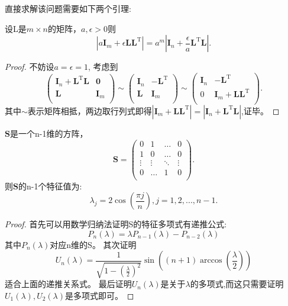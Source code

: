 直接求解该问题需要如下两个引理:
\begin{lemma}\label{lemma:change}
设L是$m\times n$的矩阵，$a,\epsilon > 0$则
\begin{equation}
|a\bm{I}_m+\epsilon \bm{L}\bm{L}^{\textrm{T}} |=a^m|\bm{I}_n+\frac{\epsilon}{a} \bm{L}^{\textrm{T}} \bm{L}|.
\end{equation}
\end{lemma}
\begin{proof}
不妨设$a=\epsilon=1$,
考虑到
\begin{equation}
\left(\begin{array}{cc}
\bm{I}_n+\bm{L}^{\textrm{T}} \bm{L}&\bm{0}\\
\bm{L}&\bm{I}_m\\
\end{array}\right)\sim\left(\begin{array}{cc}
\bm{I}_n&-\bm{L}^{\textrm{T}} \\
\bm{L}&\bm{I}_m\\
\end{array}\right)\sim\left(\begin{array}{cc}
\bm{I}_n&-\bm{L}^{\textrm{T}} \\
0&\bm{I}_m+\bm{L}\bm{L}^{\textrm{T}} \\
\end{array}\right).
\end{equation}
其中$\sim$表示矩阵相抵，两边取行列式即得$|\bm{I}_m+\bm{L}\bm{L}^{\textrm{T}} |=|\bm{I}_n+\bm{L}^{\textrm{T}} \bm{L}|$,证毕。
\end{proof}


\begin{lemma}\label{lemma:special}
$\bm{S}$是一个n-1维的方阵，\begin{equation}
\bm{S}=\left(
\begin{array}{cccc}
0&1&\dots&0\\
1&0&\dots&0\\
\vdots&\vdots&\ddots&\vdots\\
0&\dots&1&0\\
\end{array}\right).
\end{equation}则$\bm{S}$的n-1个特征值为:
\begin{equation}
\lambda_j=2\cos(\frac{\pi j}{n}),j=1,2,...,n-1.
\end{equation}
\end{lemma}
\begin{proof}
首先可以用数学归纳法证明S的特征多项式有递推公式:\begin{equation}
P_n(\lambda)=\lambda P_{n-1}(\lambda)-P_{n-2}(\lambda)
\end{equation}
其中$P_n(\lambda)$对应n维的S。
其次证明
\begin{equation}
U_n(\lambda)=\frac{1}{\sqrt{1-(\frac{\lambda}{2})^2}}\sin((n+1)\arccos(\frac{\lambda}{2}))
\end{equation}
适合上面的递推关系式。
最后证明$U_n(\lambda)$是关于$\lambda$的多项式,而这只需要证明$U_1(\lambda),U_2(\lambda)$是多项式即可。
\end{proof}

